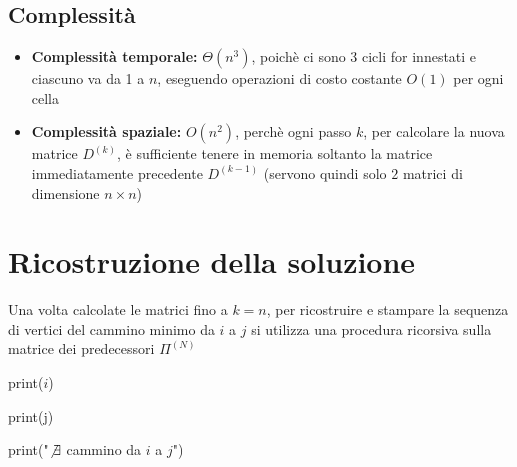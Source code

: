 \subsection{Complessità}
\begin{itemize}
    \item \textbf{Complessità temporale:} $\Theta(n^3)$, poichè ci sono 3 cicli for innestati e ciascuno va da 1 a $n$, eseguendo operazioni di costo costante $O(1)$ per ogni cella
    \item \textbf{Complessità spaziale:} $O(n^2)$, perchè ogni passo $k$, per calcolare la nuova matrice $D^{(k)}$, è sufficiente tenere in memoria soltanto la matrice immediatamente precedente $D^{(k-1)}$ (servono quindi solo $2$ matrici di dimensione $n \times n$)
\end{itemize}

\section{Ricostruzione della soluzione}
Una volta calcolate le matrici fino a $k=n$, per ricostruire e stampare la sequenza di vertici del cammino minimo da $i$ a $j$ si utilizza una procedura ricorsiva sulla matrice dei predecessori $\Pi^{(N)}$

\begin{algorithm}
    \begin{algorithmic}
                \State print($i$)

                \Else
                        \State print(j)

                        \Else
                        \State print("$\not \exists$ cammino da $i$ a $j$")
                    \EndIf
            \EndIf
        \EndProcedure
    \end{algorithmic}
\end{algorithm}